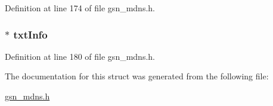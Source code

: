 Definition at line 174 of file gsn\_\-mdns.h.

\hypertarget{a00146_a1d40c0fd52db9aaeaa3cd93b6561506c}{
\subsubsection[{txtInfo}]{$\ast$ {\bf txtInfo}}}
\label{a00146_a1d40c0fd52db9aaeaa3cd93b6561506c}


Definition at line 180 of file gsn\_\-mdns.h.



The documentation for this struct was generated from the following file:\begin{DoxyCompactItemize}
\item 
\hyperlink{a00526}{gsn\_\-mdns.h}\end{DoxyCompactItemize}
